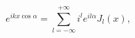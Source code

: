 \begin{equation}
e^{ikx\cos \alpha }=\sum_{l=-\infty }^{+\infty } i^{l}e^{il\alpha }J_{l}\left( x\right),
\end{equation}


